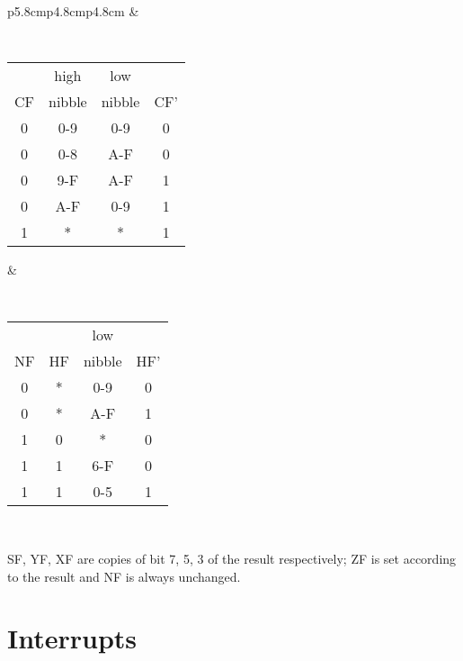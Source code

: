 {\begin{tabular}{p{5.8cm}p{4.8cm}p{4.8cm}}
		&

		{\tt
			\begin{tabular}[t]{c|c|c|c}
				   & high   & low    & \\
				CF & nibble & nibble & CF' \\ 	
				\hline
				0 & 0-9    & 0-9    &  0  \\
				0 & 0-8    & A-F    &  0  \\
				0 & 9-F    & A-F    &  1  \\
				0 & A-F    & 0-9    &  1  \\
				1 &  *     &  *     &  1  \\ 
				\hline
			\end{tabular}
		}

		&
		
		{\tt
			\begin{tabular}[t]{c|c|c|c}
				   &    & low    & \\
				NF & HF & nibble & HF' \\ 
				\hline
				0 &  * & 0-9    &  0  \\
				0 &  * & A-F    &  1  \\
				1 &  0 &  *     &  0  \\
				1 &  1 & 6-F    &  0  \\
				1 &  1 & 0-5    &  1  \\ 
				\hline
			\end{tabular}
		}
		
		\\

	\end{tabular}
}

SF, YF, XF are copies of bit 7, 5, 3 of the result respectively; ZF is set according to the result and NF is always unchanged.


\pagebreak
\section{Interrupts}
\label{interrupts}

